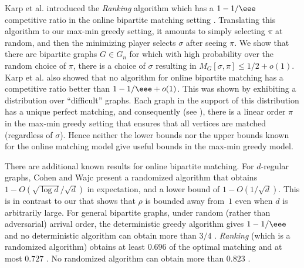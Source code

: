 \documentclass{toc}
\theoremstyle{plain}
\begin{document}
Karp et al. \cite{KarpVV1990} introduced the \emph{Ranking} algorithm which
has a %
$1-1/\eee$   %
competitive ratio in the online bipartite matching setting \cite{KarpVV1990,Goel2008}. Translating this algorithm to our max-min greedy setting, it amounts to simply selecting $\pi$ at random, and then the minimizing player selects $\sigma$ after seeing $\pi$. We show that there are bipartite graphs $G \in G_n$ for which with high probability over the random choice of $\pi$, there is a choice of $\sigma$ resulting in $M_G[\sigma,\pi] \le 1/2 + o(1)$. Karp et al. \cite{KarpVV1990} also showed that no algorithm for online bipartite matching has a competitive ratio better than %
$1 - 1/\eee + o(1)$.   %
This was shown by exhibiting a distribution over ``difficult'' graphs. Each graph in the support of this distribution has a unique perfect matching, and consequently (see ), there is a linear order $\pi$ in the max-min greedy setting that ensures that all vertices are matched (regardless of $\sigma$). Hence neither the lower bounds nor the upper bounds known for the online matching model give useful bounds in the max-min greedy model.

There are additional known results for online bipartite matching.
For $d$-regular graphs, Cohen and Wajc \cite{CohenW18} present a
%
randomized  %
algorithm that obtains $1-O(\sqrt{\log d}/\sqrt{d})$ in expectation, and a lower bound of $1-O(1/\sqrt{d})$. This is in contrast to our  that shows that $\rho$ is bounded away from~$1$ even when $d$ is arbitrarily large.
For general bipartite graphs, under random (rather than adversarial) arrival order, the deterministic greedy algorithm gives %
$1-1/\eee$    %
and no deterministic algorithm can obtain more than $3/4$ \cite{Goel2008}.
\emph{Ranking} (which is a randomized algorithm) obtains at least $0.696$ of the optimal matching \cite{Mahdian2011} and at most $0.727$ \cite{Karande2011}.
No %
randomized   %
algorithm can obtain more than $0.823$ \cite{Manshadi2012}.
\end{document}
